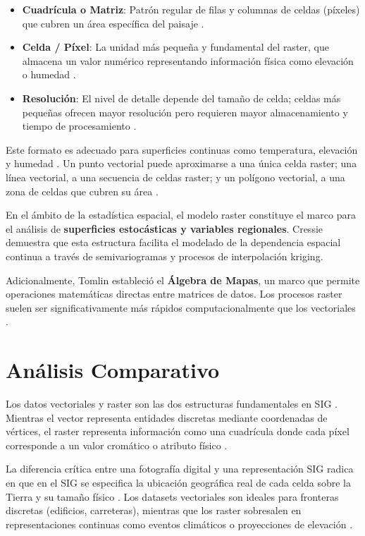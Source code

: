 \documentclass[11pt,a4paper]{article}
\begin{document}
\begin{itemize}
    \item \textbf{Cuadrícula o Matriz}: Patrón regular de filas y columnas de celdas (píxeles) que cubren un área específica del paisaje \cite{bajjali2017working}.
    \item \textbf{Celda / Píxel}: La unidad más pequeña y fundamental del raster, que almacena un valor numérico representando información física como elevación o humedad \cite{bajjali2017working}.
    \item \textbf{Resolución}: El nivel de detalle depende del tamaño de celda; celdas más pequeñas ofrecen mayor resolución pero requieren mayor almacenamiento y tiempo de procesamiento \cite{bajjali2017working}.
\end{itemize}

Este formato es adecuado para superficies continuas como temperatura, elevación y humedad \cite{bajjali2017working}. Un punto vectorial puede aproximarse a una única celda raster; una línea vectorial, a una secuencia de celdas raster; y un polígono vectorial, a una zona de celdas que cubren su área \cite{bajjali2017working}.

En el ámbito de la estadística espacial, el modelo raster constituye el marco para el análisis de \textbf{superficies estocásticas y variables regionales}. Cressie \cite{cressie1993statistics} demuestra que esta estructura facilita el modelado de la dependencia espacial continua a través de semivariogramas y procesos de interpolación kriging.

Adicionalmente, Tomlin \cite{tomlin1990geographic} estableció el \textbf{Álgebra de Mapas}, un marco que permite operaciones matemáticas directas entre matrices de datos. Los procesos raster suelen ser significativamente más rápidos computacionalmente que los vectoriales \cite{bajjali2017working}.

\section{Análisis Comparativo}

Los datos vectoriales y raster son las dos estructuras fundamentales en SIG \cite{maesen2024introduction}. Mientras el vector representa entidades discretas mediante coordenadas de vértices, el raster representa información como una cuadrícula donde cada píxel corresponde a un valor cromático o atributo físico \cite{maesen2024introduction, giofandi2023comparison}.

La diferencia crítica entre una fotografía digital y una representación SIG radica en que en el SIG se especifica la ubicación geográfica real de cada celda sobre la Tierra y su tamaño físico \cite{giofandi2023comparison}. Los datasets vectoriales son ideales para fronteras discretas (edificios, carreteras), mientras que los raster sobresalen en representaciones continuas como eventos climáticos o proyecciones de elevación \cite{giofandi2023comparison, pingel2018raster}.
\end{document}
